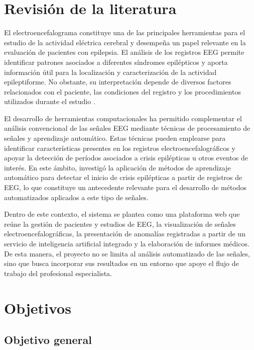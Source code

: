 \section{Revisión de la literatura}
\label{sec:revision-literatura}

El electroencefalograma constituye una de las principales herramientas para el estudio de la actividad eléctrica cerebral y desempeña un papel relevante en la evaluación de pacientes con epilepsia. El análisis de los registros EEG permite identificar patrones asociados a diferentes síndromes epilépticos y aporta información útil para la localización y caracterización de la actividad epileptiforme. No obstante, su interpretación depende de diversos factores relacionados con el paciente, las condiciones del registro y los procedimientos utilizados durante el estudio \citep{NoachtarRemi2009}.

El desarrollo de herramientas computacionales ha permitido complementar el análisis convencional de las señales EEG mediante técnicas de procesamiento de señales y aprendizaje automático. Estas técnicas pueden emplearse para identificar características presentes en los registros electroencefalográficos y apoyar la detección de períodos asociados a crisis epilépticas u otros eventos de interés. En este ámbito, \citet{Shoeb2009} investigó la aplicación de métodos de aprendizaje automático para detectar el inicio de crisis epilépticas a partir de registros de EEG, lo que constituye un antecedente relevante para el desarrollo de métodos automatizados aplicados a este tipo de señales.

Dentro de este contexto, el sistema se plantea como una plataforma web que reúne la gestión de pacientes y estudios de EEG, la visualización de señales electroencefalográficas, la presentación de anomalías registradas a partir de un servicio de inteligencia artificial integrado y la elaboración de informes médicos. De esta manera, el proyecto no se limita al análisis automatizado de las señales, sino que busca incorporar sus resultados en un entorno que apoye el flujo de trabajo del profesional especialista.

\section{Objetivos}
\label{sec:objetivos}

\subsection{Objetivo general}
\label{subsec:objetivo-general}


